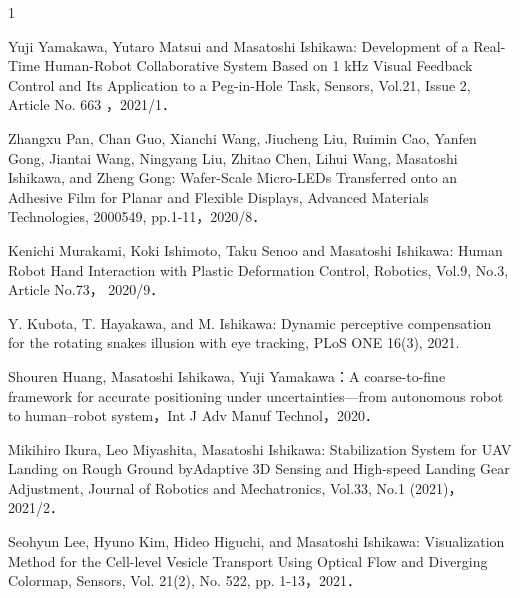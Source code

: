 \begin{雑誌論文}{1}

Yuji Yamakawa, Yutaro Matsui and Masatoshi Ishikawa: Development of a Real-Time Human-Robot Collaborative System Based on 1 kHz Visual Feedback Control and Its Application to a Peg-in-Hole Task, Sensors, Vol.21, Issue 2, Article No. 663 ，2021/1．

Zhangxu Pan, Chan Guo, Xianchi Wang, Jiucheng Liu, Ruimin Cao, Yanfen Gong, Jiantai Wang, Ningyang Liu, Zhitao Chen, Lihui Wang, Masatoshi Ishikawa, and Zheng Gong: Wafer-Scale Micro-LEDs Transferred onto an Adhesive Film for Planar and Flexible Displays, Advanced Materials Technologies, 2000549, pp.1-11，2020/8．

Kenichi Murakami, Koki Ishimoto, Taku Senoo and Masatoshi Ishikawa: Human Robot Hand Interaction with Plastic Deformation Control, Robotics, Vol.9, No.3, Article No.73，	2020/9．

Y. Kubota, T. Hayakawa, and M. Ishikawa: Dynamic perceptive compensation for the rotating snakes illusion with eye tracking, PLoS ONE 16(3), 2021.

Shouren Huang, Masatoshi Ishikawa, Yuji Yamakawa：A coarse-to-fine framework for accurate positioning under uncertainties—from autonomous robot to human–robot system，Int J Adv Manuf Technol，2020．

Mikihiro Ikura, Leo Miyashita, Masatoshi Ishikawa: Stabilization System for UAV Landing on Rough Ground byAdaptive 3D Sensing and High-speed Landing Gear Adjustment, Journal of Robotics and Mechatronics, Vol.33, No.1 (2021)，2021/2．

Seohyun Lee, Hyuno Kim, Hideo Higuchi, and Masatoshi Ishikawa: Visualization Method for the Cell-level Vesicle Transport Using Optical Flow and Diverging Colormap, Sensors, Vol. 21(2), No. 522, pp. 1-13，2021．


\end{雑誌論文}
